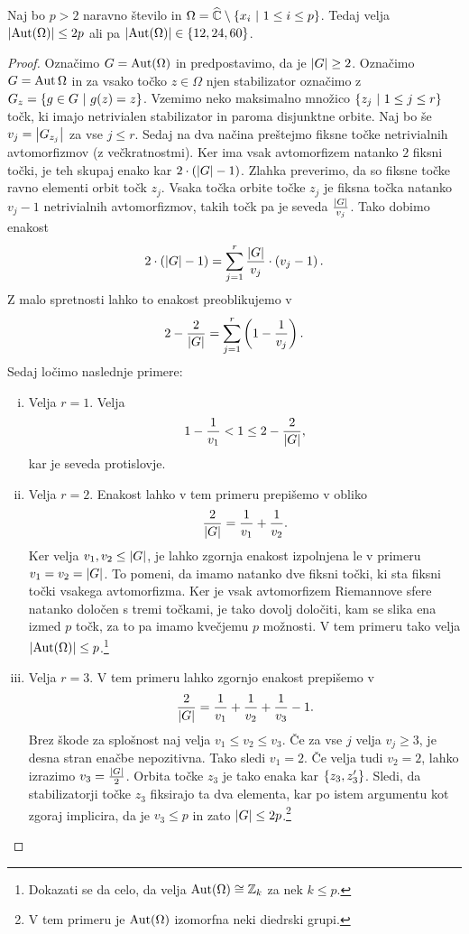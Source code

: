 \begin{trditev}
Naj bo $p > 2$ naravno število in
$\Omega = \widehat{\mathbb{C}} \setminus \left\{x_i~\middle\vert~1 \leq i \leq p\right\}$. Tedaj velja
$\left\lvert \operatorname{Aut}(\Omega)\right\rvert \leq 2p$ ali pa
$\left\lvert \operatorname{Aut}(\Omega)\right\rvert \in \left\{12, 24, 60\right\}$.
\end{trditev}

\begin{proof}
Označimo $G = \operatorname{Aut}(\Omega)$ in predpostavimo, da je
$\left\lvert G\right\rvert \geq 2$. Označimo $G = \operatorname{Aut} \Omega$ in za vsako točko
$z \in \Omega$ njen stabilizator označimo z
$G_z = \left\{g \in G~\middle\vert~g(z) = z\right\}$. Vzemimo neko maksimalno množico
$\left\{z_j~\middle\vert~1 \leq j \leq r\right\}$ točk, ki imajo netrivialen
stabilizator in paroma disjunktne orbite. Naj bo še
$v_j = \left\lvert G_{z_j}\right\rvert$ za vse $j \leq r$. Sedaj na dva načina
preštejmo fiksne točke netrivialnih avtomorfizmov (z
večkratnostmi). Ker ima vsak avtomorfizem natanko $2$ fiksni točki,
je teh skupaj enako kar $2 \cdot \left(\left\lvert G\right\rvert - 1\right)$. Zlahka
preverimo, da so fiksne točke ravno elementi orbit točk $z_j$.
Vsaka točka orbite točke $z_j$ je fiksna točka natanko $v_j - 1$
netrivialnih avtomorfizmov, takih točk pa je seveda
$\frac{\left\lvert G\right\rvert}{v_j}$. Tako dobimo enakost
\[
2 \cdot \left(\left\lvert G\right\rvert - 1\right) =
\sum_{j=1}^r \frac{\left\lvert G\right\rvert}{v_j} \cdot \left(v_j - 1\right).
\]
Z malo spretnosti lahko to enakost preoblikujemo v
\[
2 - \frac{2}{\left\lvert G\right\rvert} = \sum_{j=1}^r \left(1 - \frac{1}{v_j}\right).
\]
Sedaj ločimo naslednje primere:

\begin{enumerate}[i)]
\item Velja $r = 1$. Velja
\[
1 - \frac{1}{v_1} < 1 \leq 2 - \frac{2}{\left\lvert G\right\rvert},
\]
kar je seveda protislovje.

\item Velja $r = 2$. Enakost lahko v tem primeru prepišemo v obliko
\[
\frac{2}{\left\lvert G\right\rvert} = \frac{1}{v_1} + \frac{1}{v_2}.
\]
Ker velja $v_1, v_2 \leq \left\lvert G\right\rvert$, je lahko zgornja enakost
izpolnjena le v primeru $v_1 = v_2 = \left\lvert G\right\rvert$. To pomeni, da imamo
natanko dve fiksni točki, ki sta fiksni točki vsakega avtomorfizma.
Ker je vsak avtomorfizem Riemannove sfere natanko določen s tremi
točkami, je tako dovolj določiti, kam se slika ena izmed $p$ točk,
za to pa imamo kvečjemu $p$ možnosti. V tem primeru tako velja
$\left\lvert \operatorname{Aut}(\Omega)\right\rvert \leq p$.\footnote{Dokazati se da celo, da velja
$\operatorname{Aut}(\Omega) \cong \mathbb{Z}_k$ za nek $k \leq p$.}

\item Velja $r = 3$. V tem primeru lahko zgornjo enakost prepišemo
v
\[
\frac{2}{\left\lvert G\right\rvert} =
\frac{1}{v_1} + \frac{1}{v_2} + \frac{1}{v_3} - 1.
\]
Brez škode za splošnost naj velja $v_1 \leq v_2 \leq v_3$. Če za
vse $j$ velja $v_j \geq 3$, je desna stran enačbe nepozitivna. Tako
sledi $v_1 = 2$. Če velja tudi $v_2 = 2$, lahko izrazimo
$v_3 = \frac{\left\lvert G\right\rvert}{2}$. Orbita točke $z_3$ je tako enaka kar
$\left\{z_3, z_3'\right\}$. Sledi, da stabilizatorji točke $z_3$ fiksirajo
ta dva elementa, kar po istem argumentu kot zgoraj implicira, da je
$v_3 \leq p$ in zato $\left\lvert G\right\rvert \leq 2p$.\footnote{V tem primeru je
$\operatorname{Aut}(\Omega)$ izomorfna neki diedrski grupi.}


\end{enumerate}
\end{proof}
